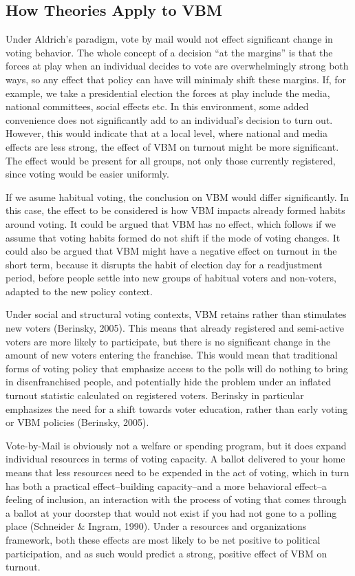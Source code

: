 \documentclass[12pt,twoside]{reedthesis}
\begin{document}
  \subsection{How Theories Apply to VBM}\label{how-theories-apply-to-vbm}
  
  Under Aldrich's paradigm, vote by mail would not effect significant
  change in voting behavior. The whole concept of a decision ``at the
  margins'' is that the forces at play when an individual decides to vote
  are overwhelmingly strong both ways, so any effect that policy can have
  will minimaly shift these margins. If, for example, we take a
  presidential election the forces at play include the media, national
  committees, social effects etc. In this environment, some added
  convenience does not significantly add to an individual's decision to
  turn out. However, this would indicate that at a local level, where
  national and media effects are less strong, the effect of VBM on turnout
  might be more significant. The effect would be present for all groups,
  not only those currently registered, since voting would be easier
  uniformly.
  
  If we asume habitual voting, the conclusion on VBM would differ
  significantly. In this case, the effect to be considered is how VBM
  impacts already formed habits around voting. It could be argued that VBM
  has no effect, which follows if we assume that voting habits formed do
  not shift if the mode of voting changes. It could also be argued that
  VBM might have a negative effect on turnout in the short term, because
  it disrupts the habit of election day for a readjustment period, before
  people settle into new groups of habitual voters and non-voters, adapted
  to the new policy context.
  
  Under social and structural voting contexts, VBM retains rather than
  stimulates new voters (Berinsky, 2005). This means that already
  registered and semi-active voters are more likely to participate, but
  there is no significant change in the amount of new voters entering the
  franchise. This would mean that traditional forms of voting policy that
  emphasize access to the polls will do nothing to bring in
  disenfranchised people, and potentially hide the problem under an
  inflated turnout statistic calculated on registered voters. Berinsky in
  particular emphasizes the need for a shift towards voter education,
  rather than early voting or VBM policies (Berinsky, 2005).
  
  Vote-by-Mail is obviously not a welfare or spending program, but it does
  expand individual resources in terms of voting capacity. A ballot
  delivered to your home means that less resources need to be expended in
  the act of voting, which in turn has both a practical effect--building
  capacity--and a more behavioral effect--a feeling of inclusion, an
  interaction with the process of voting that comes through a ballot at
  your doorstep that would not exist if you had not gone to a polling
  place (Schneider \& Ingram, 1990). Under a resources and organizations
  framework, both these effects are most likely to be net positive to
  political participation, and as such would predict a strong, positive
  effect of VBM on turnout.
  
\end{document}

